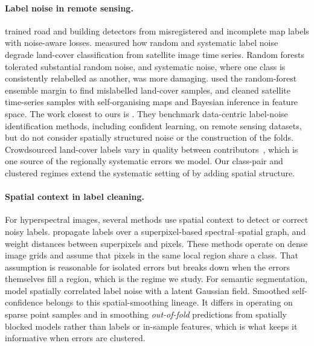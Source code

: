 \documentclass[11pt]{article}
\begin{document}
\paragraph{Label noise in remote sensing.}
\citet{mnih2012learning} trained road and building detectors from misregistered
and incomplete map labels with noise-aware losses. \citet{pelletier2017effect}
measured how random and systematic label noise degrade land-cover classification
from satellite image time series. Random forests tolerated substantial random
noise, and systematic noise, where one class is consistently relabelled as
another, was more damaging. \citet{mellor2015exploring} used the random-forest
ensemble margin to find mislabelled land-cover samples, and
\citet{santos2021quality} cleaned satellite time-series samples with
self-organising maps and Bayesian inference in feature space. The work closest
to ours is \citet{krober2026assessment}. They benchmark data-centric
label-noise identification methods, including confident learning, on remote
sensing datasets, but do not consider spatially structured noise or the
construction of the folds. Crowdsourced land-cover labels vary in quality
between contributors~\citep{see2013comparing}, which is one source of the
regionally systematic errors we model. Our class-pair and clustered regimes
extend the systematic setting of \citet{pelletier2017effect} by adding spatial
structure.

\paragraph{Spatial context in label cleaning.}
For hyperspectral images, several methods use spatial context to detect or
correct noisy labels. \citet{jiang2019hyperspectral} propagate labels over a
superpixel-based spectral--spatial graph, and \citet{tu2020hyperspectral} weight
distances between superpixels and pixels. These methods operate on dense image
grids and assume that pixels in the same local region share a class. That
assumption is reasonable for isolated errors but breaks down when the errors
themselves fill a region, which is the regime we study. For semantic
segmentation, \citet{tadokoro2025bayesian} model spatially correlated label
noise with a latent Gaussian field. Smoothed self-confidence belongs to this
spatial-smoothing lineage. It differs in operating on sparse point samples and
in smoothing \emph{out-of-fold} predictions from spatially blocked models rather
than labels or in-sample features, which is what keeps it informative when
errors are clustered.
\end{document}
